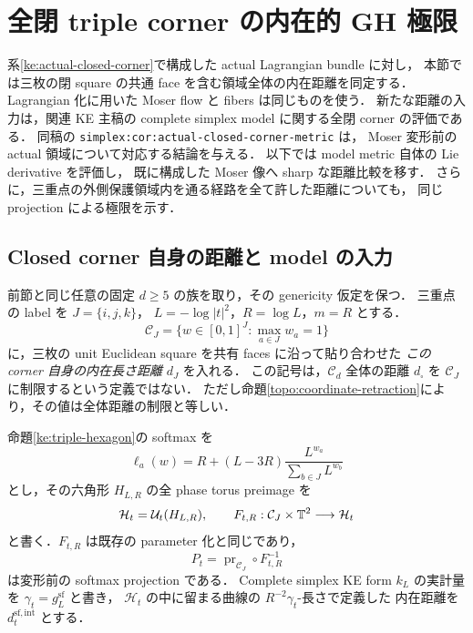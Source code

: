 \section{全閉 triple corner の内在的 GH 極限}
\label{ke:closed-corner-gh-section}

系\ref{ke:actual-closed-corner}で構成した actual Lagrangian bundle に対し，
本節では三枚の閉 square の共通 face を含む領域全体の内在距離を同定する．
Lagrangian 化に用いた Moser flow と fibers は同じものを使う．
新たな距離の入力は，関連 KE 主稿\cite[Part~IV,
\texttt{simplex:thm:closed-corner-model}]{KELocalCurrent}の
complete simplex model に関する全閉 corner の評価である．
同稿の \texttt{simplex:cor:actual-closed-corner-metric} は，
Moser 変形前の actual 領域について対応する結論を与える．
以下では model metric 自体の Lie derivative を評価し，
既に構成した Moser 像へ sharp な距離比較を移す．
さらに，三重点の外側保護領域内を通る経路を全て許した距離についても，
同じ projection による極限を示す．

\subsection{Closed corner 自身の距離と model の入力}

前節と同じ任意の固定 $d\ge5$ の族を取り，その genericity 仮定を保つ．
三重点の label を $J=\{i,j,k\}$，
$L=-\log|t|^2$，$R=\log L$，$m=R$ とする．
\[
 \mathcal C_J
 =\{w\in[0,1]^J:\max_{a\in J}w_a=1\}
\]
に，三枚の unit Euclidean square を共有 faces に沿って貼り合わせた
\emph{この corner 自身の内在長さ距離} $d_J$ を入れる．
この記号は，$\mathcal C_d$ 全体の距離 $d_\square$ を
$\mathcal C_J$ に制限するという定義ではない．
ただし命題\ref{topo:coordinate-retraction}により，その値は全体距離の制限と等しい．

命題\ref{ke:triple-hexagon}の softmax を
\[
 \ell_a(w)=R+(L-3R)\frac{L^{w_a}}{\sum_{b\in J}L^{w_b}}
\]
とし，その六角形 $H_{L,R}$ の全 phase torus preimage を
\[
 \mathcal H_t=\mathcal U_t(H_{L,R}),\qquad
 F_{t,R}:\mathcal C_J\times\mathbb T^2\longrightarrow\mathcal H_t
\]
と書く．$F_{t,R}$ は既存の parameter 化と同じであり，
\[
 P_t=\operatorname{pr}_{\mathcal C_J}\circ F_{t,R}^{-1}
\]
は変形前の softmax projection である．
Complete simplex KE form $k_L$ の実計量を $\gamma_t=g_L^{\mathrm{sf}}$ と書き，
$\mathcal H_t$ の中に留まる曲線の $R^{-2}\gamma_t$-長さで定義した
内在距離を $d_t^{\mathrm{sf,int}}$ とする．

